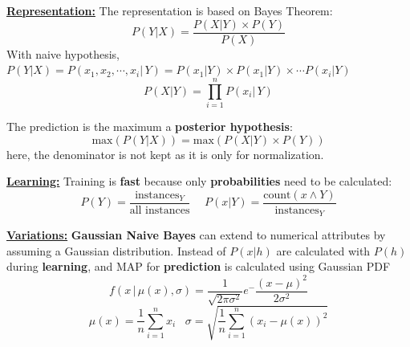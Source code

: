 \documentclass[letterpaper, 10.5pt,landscape]{article}
\makeatletter
\def\mathcolor#1#{\@mathcolor{#1}}
\def\@mathcolor#1#2#3{%
  \protect\leavevmode
  \begingroup
    \color#1{#2}#3%
  \endgroup
}
\renewcommand{\subsubsection}{\@startsection{subsubsection}{3}{0mm}%
                                {-1ex plus -.5ex minus -.2ex}%
                                {1ex plus .2ex}%
                                {\normalfont\small\bfseries}}
\makeatother
\begin{document}
\begin{multicols*}{3}
\textbf{\underline{Representation:}} 
The representation is based on Bayes Theorem:
\vspace{-3pt}
\[\boxed{P(Y|X) = \frac{P(X|Y) \times P(Y)}{P(X)}} \]
With naive hypothesis, \(P(Y|X) = P(x_{1}, x_{2}, \cdots, x_{i} | \, Y) = P(x_{1} | Y) \times P(x_{1} | Y) \times \cdots P(x_{i} | Y) \) 
\vspace{-3pt}
\[\boxed{P(X|Y) = \prod^{n}_{i=1} P(x_{i} | \, Y)} \]

\vspace{3pt}
The prediction is the maximum a \textbf{posterior hypothesis}:
\vspace{-3pt}
\[\boxed{\text{max}\left(P(Y|X)\right) = \text{max}\left(P(X|Y) \times P(Y)\right)} \] 
here, the denominator is not kept as it is only for normalization.

\vspace{3pt}
\textbf{\underline{Learning:}} Training is \textbf{fast} because only \textbf{probabilities} need to be calculated: 
\vspace{-3pt}
\[\boxed{P(Y) = \frac{\text{instances}_{Y}}{ \text{all instances}}} \hspace{15pt} \boxed{P(x|Y) = \frac{\text{count}(x \land Y  )}{\text{instances}_{Y}}}\]



\vspace{3pt} 
\textbf{\underline{Variations:}} \textbf{Gaussian Naive Bayes} can extend to numerical attributes by assuming a Gaussian distribution. Instead of $P(x|h)$ are calculated with $P(h)$ during \textbf{learning}, and MAP for \textbf{prediction} is calculated using Gaussian PDF
\vspace{-3pt}
\[\boxed{f(x \, | \,  \mu(x), \sigma) = \frac{1}{\sqrt{2 \pi \sigma^{2}}} e^-{\frac{(x-\mu)^{2}}{2\sigma^{2}}} }\]
\vspace{-3pt}
\[\mu(x) = \frac{1}{n} \sum^{n}_{i=1} x_{i} \hspace{10pt}  \sigma = \sqrt{\frac{1}{n} \sum^{n}_{i=1} \left( x_{i} - \mu(x) \right)^{2}} \]









\end{multicols*}
\end{document}
